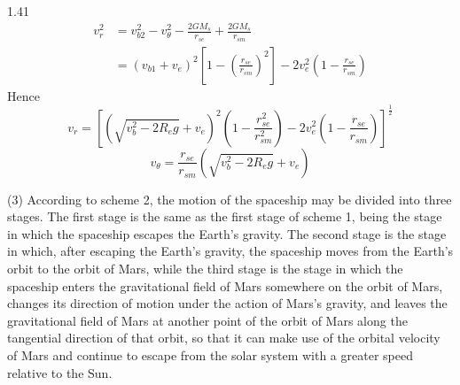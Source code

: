 \begin{solution}{1.41}
\[
\begin{aligned}
v_r^2&=v_{b2}^2-v_\theta^2-\frac{2GM_s}{r_{se}}+\frac{2GM_s}{r_{sm}}\\
&=(v_{b1}+v_e)^2\left[1-\left(\frac{r_{se}}{r_{sm}}\right)^2\right]-2v_e^2\left(1-\frac{r_{se}}{r_{sm}}\right)
\end{aligned}
\]
Hence
\begin{equation}
v_r=\left[\left(\sqrt{v_b^2-2R_eg}+v_e\right)^2\left(1-\frac{r_{se}^2}{r_{sm}^2}\right)-2v_e^2\left(1-\frac{r_{se}}{r_{sm}}\right)\right]^{\frac{1}{2}} \tag{10}
\end{equation}
\begin{equation}
v_\theta=\frac{r_{se}}{r_{sm}}\left(\sqrt{v_b^2-2R_eg}+v_e\right) \tag{11}
\end{equation}

(3) According to scheme 2, the motion of the spaceship may be divided into three stages. The first stage is the same as the first stage of scheme 1, being the stage in which the spaceship escapes the Earth's gravity. The second stage is the stage in which, after escaping the Earth's gravity, the spaceship moves from the Earth's orbit to the orbit of Mars, while the third stage is the stage in which the spaceship enters the gravitational field of Mars somewhere on the orbit of Mars, changes its direction of motion under the action of Mars's gravity, and leaves the gravitational field of Mars at another point of the orbit of Mars along the tangential direction of that orbit, so that it can make use of the orbital velocity of Mars and continue to escape from the solar system with a greater speed relative to the Sun.


\end{solution}
